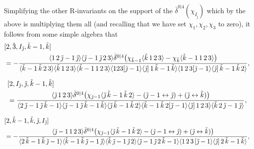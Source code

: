 \documentclass[12pt]{article}
\numberwithin{equation}{section}
\begin{document}
Simplifying the other R-invariants on the support of the \(\bar{\delta}^{0|4}(\chi_{I_{\tilde{\jmath}}})\) which by the above is multiplying them all (and recalling that we have set \(\chi_1,\chi_2,\chi_3\) to zero), it follows from some simple algebra that
\small{
\begin{align}
&[2,\hat{3},I_{\tilde{\jmath}},\tilde{k}-1,\tilde{k}] \notag \\
&= -\frac{\langle 1 \, 2 \, \tilde{\jmath}-1 \, \tilde{\jmath}\rangle \langle \tilde{\jmath}-1 \, \tilde{\jmath} \, 2 \, 3 \rangle \bar{\delta}^{0|4}\bigl(\chi_{\tilde{k}-1}\langle \tilde{k} \, 1 \, 2 \, 3 \rangle - \chi_{\tilde{k}}\langle \tilde{k}-1 \, 1 \, 2 \, 3\rangle\bigr)}{\langle \tilde{k}-1 \, \tilde{k} \, 2 \, 3\rangle \langle \tilde{k} \, 1 \, 2 \, 3 \rangle \langle \tilde{k} -1 \, 1 \, 2 \, 3 \rangle \langle 123[\tilde{\jmath}-1\rangle \langle \tilde{\jmath}] \, 1\, \tilde{k}-1 \, \tilde{k} \rangle  \langle 1 \, 2 \, 3[\tilde{\jmath}-1\rangle \langle \tilde{\jmath}] \, \tilde{k}-1 \, \tilde{k} \, 2 \rangle},
\end{align}}

\begin{align}
&[2, I_{\tilde{\jmath}}, \tilde{\jmath}, \tilde{k}-1, \tilde{k}] \notag \\
&= \frac{\langle \tilde{\jmath} \, 1 \, 2 \, 3 \rangle \bar{\delta}^{0|4}\bigl(\chi_{\tilde{\jmath}-1}\langle \tilde{\jmath}  \, \tilde{k}-1 \, \tilde{k} \, 2 \rangle - (\tilde{\jmath}-1 \leftrightarrow \tilde{\jmath}) + (\tilde{\jmath} \leftrightarrow \tilde{k})\bigr)}{\langle 2 \, \tilde{\jmath} -1 \, \tilde{\jmath} \, \tilde{k} -1 \rangle \langle \tilde{\jmath}-1 \, \tilde{\jmath} \, \tilde{k}-1 \, \tilde{k} \rangle \langle \tilde{\jmath} \, \tilde{k}-1 \, \tilde{k} \, 2 \rangle \langle \tilde{k}-1 \, \tilde{k} \, 2 [\tilde{\jmath} -1 \rangle \langle \tilde{\jmath}] \, 1 \, 2 \, 3 \rangle \langle \tilde{k} \, 2 \, \tilde{\jmath}-1 \, \tilde{\jmath} \rangle },
\end{align}

\begin{align}
&[2, \tilde{k}-1, \tilde{k},\tilde{\jmath},I_{\tilde{\jmath}}] \notag \\
&=-\frac{\langle \tilde{\jmath}-1 \, 1 \, 2 \, 3 \rangle\bar{\delta}^{0|4}\bigl(\chi_{\tilde{\jmath}-1} \langle \tilde{\jmath}  \, \tilde{k}-1 \, \tilde{k} \, 2\rangle - (\tilde{\jmath}-1 \leftrightarrow \tilde{\jmath}) + (\tilde{\jmath} \leftrightarrow \tilde{k})\bigr)}{ \langle 2 \, \tilde{k}-1 \, \tilde{k} \, \tilde{\jmath} -1 \rangle \langle \tilde{k}-1 \, \tilde{k} \, \tilde{\jmath}-1 \, \tilde{\jmath} \rangle \langle \tilde{k} \, \tilde{\jmath}-1 \, \tilde{\jmath} \, 2 \rangle \langle \tilde{\jmath}-1 \, \tilde{\jmath} \, 2 \, \tilde{k}-1 \rangle \langle 1 \, 2 \, 3 \, [\tilde{\jmath}-1 \rangle \langle \tilde{\jmath}] \, 2 \, \tilde{k}-1 \, \tilde{k} \rangle  },
\end{align}
\end{document}
